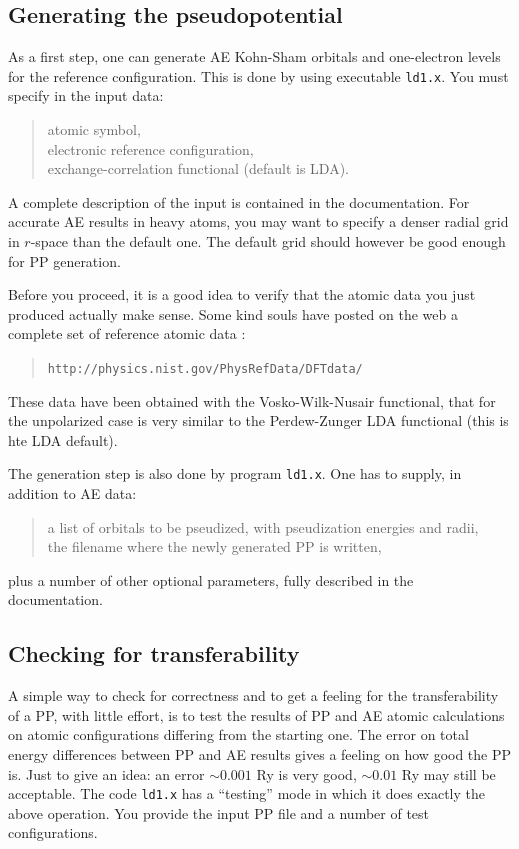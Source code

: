 \documentclass[12pt,a4paper]{article}
\begin{document}
\subsection{Generating the pseudopotential}

As a first step, one can generate AE Kohn-Sham orbitals and one-electron 
levels for the reference configuration. This is done by using executable
\texttt{ld1.x}. You must specify in the input data:
\begin{quote} 
atomic symbol,\\
electronic reference configuration,\\
exchange-correlation functional (default is LDA).
\end{quote}
A complete description of the input is contained in the documentation.
For accurate AE results in heavy atoms, you may want to specify a denser 
radial grid in $r$-space than the default one. The default grid should
however be good enough for PP generation.

Before you proceed, it is a good idea to verify that the atomic data
you just produced actually make sense. Some kind souls have posted on
the web a complete set of reference atomic data :
\begin{quote}
{\tt http://physics.nist.gov/PhysRefData/DFTdata/ }
\end{quote}
These data have been obtained with the Vosko-Wilk-Nusair functional,
that for the unpolarized case is very similar to the Perdew-Zunger 
LDA functional (this is hte LDA default).

The generation step is also done by program \texttt{ld1.x}.
One has to supply, in addition to AE data: 
\begin{quote}
a list of orbitals to be pseudized, with pseudization energies and radii,\\
the filename where the newly generated PP is written,
\end{quote}
plus a number of other optional parameters, 
fully described in the documentation.

\subsection{Checking for transferability}
\label{trans}
A simple way to check for correctness and to get a feeling for 
the transferability of a PP, with little effort, is to test the 
results of PP and AE atomic calculations on atomic configurations 
differing from the starting one. The error on total energy 
differences between PP and AE results gives a feeling on how 
good the PP is. Just to give an idea: an error $\sim 0.001$ Ry 
is very good, $\sim 0.01$ Ry may still be acceptable.
The code \texttt{ld1.x} has a ``testing'' mode in which it does
exactly the above operation. You provide the input PP file and
a number of test configurations.
\end{document}
